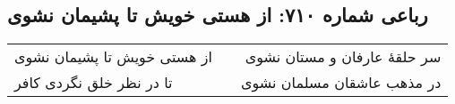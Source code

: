 \begin{center}
\section*{رباعی شماره ۷۱۰: از هستی خویش تا پشیمان نشوی}
\label{sec:sh710}
\begin{longtable}{l p{0.5cm} r}
از هستی خویش تا پشیمان نشوی
&&
سر حلقهٔ عارفان و مستان نشوی
\\
تا در نظر خلق نگردی کافر
&&
در مذهب عاشقان مسلمان نشوی
\\
\end{longtable}
\end{center}
